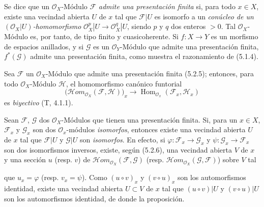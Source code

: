 \begin{env}[5.2.5]
\label{0.5.2.5-fr}
Se dice que un $\mathcal{O}_X$-Módulo $\mathcal{F}$ \emph{admite una presentación
finita} si, para todo $x\in X$, existe una vecindad abierta $U$ de $x$ tal
que $\mathcal{F}|U$ es isomorfo a un \emph{conúcleo de un
$(\mathcal{O}_X|U)$-homomorfismo}
$\mathcal{O}_X^p|U\to\mathcal{O}_X^q|U$, siendo $p$ y $q$ dos enteros $>0$.
Tal $\mathcal{O}_X$-Módulo es, por tanto, de tipo finito y cuasicoherente. Si
$f:X\to Y$ es un morfismo de espacios anillados, y si $\mathcal{G}$ es un
$\mathcal{O}_Y$-Módulo que admite una presentación finita,
$f^*(\mathcal{G})$ admite una presentación finita, como muestra el
razonamiento de (5.1.4).
\end{env}

\begin{env}[5.2.6]
\label{0.5.2.6-fr}
Sea $\mathcal{F}$ un $\mathcal{O}_X$-Módulo que admite una presentación finita
(5.2.5); entonces, para todo $\mathcal{O}_X$-Módulo $\mathcal{H}$,
el homomorfismo canónico funtorial
\[
  \bigl(\mathcal{H}\!om_{\mathcal{O}_X}(\mathcal{F},\mathcal{H})\bigr)_x
  \longrightarrow
  \operatorname{Hom}_{\mathcal{O}_x}(\mathcal{F}_x,\mathcal{H}_x)
\]
es \emph{biyectivo} (T, 4.1.1).
\end{env}

\begin{env}[5.2.7]
\label{0.5.2.7-fr}
Sean $\mathcal{F}$, $\mathcal{G}$ dos $\mathcal{O}_X$-Módulos que tienen una
presentación finita. Si, para un $x\in X$, $\mathcal{F}_x$ y $\mathcal{G}_x$
son dos $\mathcal{O}_x$-módulos \emph{isomorfos}, entonces existe una
vecindad abierta $U$ de $x$ tal que $\mathcal{F}|U$ y $\mathcal{G}|U$ son
\emph{isomorfos}. En efecto, si
$\varphi:\mathcal{F}_x\to\mathcal{G}_x$ y
$\psi:\mathcal{G}_x\to\mathcal{F}_x$ son dos isomorfismos inversos, existe,
según (5.2.6), una vecindad abierta $V$ de $x$ y una sección $u$
(resp. $v$) de
$\mathcal{H}\!om_{\mathcal{O}_X}(\mathcal{F},\mathcal{G})$ (resp.
$\mathcal{H}\!om_{\mathcal{O}_X}(\mathcal{G},\mathcal{F})$) sobre $V$
tal


que $u_x=\varphi$ (resp. $v_x=\psi$). Como $(u\circ v)_x$ y
$(v\circ u)_x$ son los automorfismos identidad, existe una vecindad
abierta $U\subset V$ de $x$ tal que $(u\circ v)|U$ y $(v\circ u)|U$ son los
automorfismos identidad, de donde la proposición.
\end{env}

